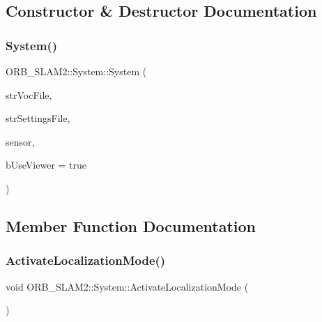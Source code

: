 \subsection{Constructor \& Destructor Documentation}
\mbox{\label{class_o_r_b___s_l_a_m2_1_1_system_a687bbabebe054f6d40b44b1ba64bc57a}} 
\subsubsection{\texorpdfstring{System()}{System()}}
{\footnotesize\ttfamily O\+R\+B\+\_\+\+S\+L\+A\+M2\+::\+System\+::\+System (\begin{DoxyParamCaption}\item[{const string \&}]{str\+Voc\+File,  }\item[{const string \&}]{str\+Settings\+File,  }\item[{const \mbox{\hyperlink{class_o_r_b___s_l_a_m2_1_1_system_a3f14b84bb9663e1129e649e592bd14cf}{e\+Sensor}}}]{sensor,  }\item[{const bool}]{b\+Use\+Viewer = {\ttfamily true} }\end{DoxyParamCaption})}



\subsection{Member Function Documentation}
\mbox{\label{class_o_r_b___s_l_a_m2_1_1_system_a6cd39ec31a23d7ba5ebe1a6e4f4a0f89}} 
\subsubsection{\texorpdfstring{Activate\+Localization\+Mode()}{ActivateLocalizationMode()}}
{\footnotesize\ttfamily void O\+R\+B\+\_\+\+S\+L\+A\+M2\+::\+System\+::\+Activate\+Localization\+Mode (\begin{DoxyParamCaption}{ }\end{DoxyParamCaption})}

